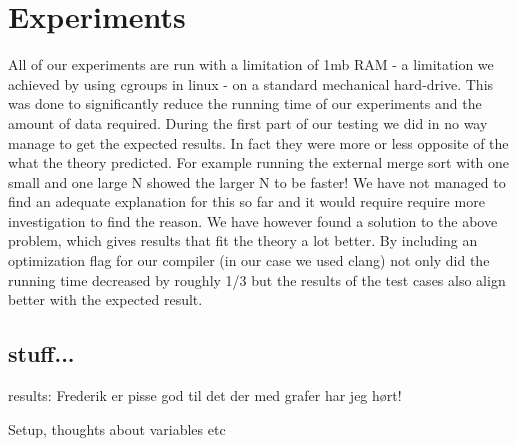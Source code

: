 \section{Experiments}

All of our experiments are run with a limitation of 1mb RAM - a limitation we achieved by using cgroups in linux - on a standard mechanical hard-drive. This was done to significantly reduce the running time of our experiments and the amount of data required. 
During the first part of our testing we did in no way manage to get the expected results. In fact they were more or less opposite of the what the theory predicted. For example running the external merge sort with one small and one large N showed the larger N to be faster! We have not managed to find an adequate explanation for this so far and it would require require more investigation to find the reason.
We have however found a solution to the above problem, which gives results that fit the theory a lot better. By including an optimization flag for our compiler (in our case we used clang) not only did the running time decreased by roughly 1/3 but the results of the test cases also align better with the expected result. 

\subsection{ stuff...}

 


results: Frederik er pisse god til det der med grafer har jeg hørt!

Setup, thoughts about variables etc

